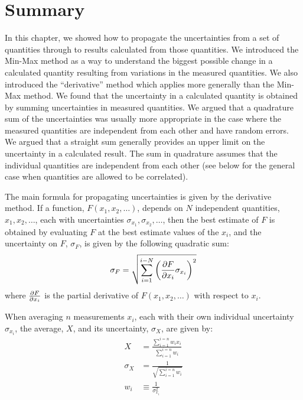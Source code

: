 \section{Summary}
\begin{chapterSummary}
In this chapter, we showed how to propagate the uncertainties from a set of quantities through to results calculated from those quantities. We introduced the Min-Max method as a way to understand the biggest possible change in a calculated quantity resulting from variations in the measured quantities. We also introduced the ``derivative'' method which applies more generally than the Min-Max method. We found that the uncertainty in a calculated quantity is obtained by summing uncertainties in measured quantities. We argued that a quadrature sum of the uncertainties was usually more appropriate in the case where the measured quantities are independent from each other and have random errors. We argued that a straight sum generally provides an upper limit on the uncertainty in a calculated result. The sum in quadrature assumes that the individual quantities are independent from each other (see below for the general case when quantities are allowed to be correlated).

The main formula for propagating uncertainties is given by the derivative method. If a function, $F(x_1, x_2, \dots)$, depends on $N$ independent quantities, $x_1, x_2, \dots$, each with uncertainties $\sigma_{x_1}, \sigma_{x_2}, \dots$, then the best estimate of $F$ is obtained by evaluating $F$ at the best estimate values of the $x_i$, and the uncertainty on $F$, $\sigma_{F}$, is given by the following quadratic sum:
\begin{align}
\sigma_{F} = \sqrt{\sum_{i=1}^{i-N}\left(\frac{\partial F}{\partial x_i}\sigma_{x_i}\right)^2}
\end{align}
where $\frac{\partial F}{\partial x_i}$ is the partial derivative of $F(x_1, x_2, \dots)$ with respect to $x_i$.

When averaging $n$ measurements $x_i$, each with their own individual uncertainty $\sigma_{x_i}$, the average, $X$, and its uncertainty, $\sigma_{X}$, are given by:
\begin{align*}
X &= \frac{\sum_{i=1}^{i=n}w_ix_i}{\sum_{i=1}^{i=n}w_i}\\
\sigma_{X} &= \frac{1}{\sqrt{\sum_{i=1}^{i=n}w_i}}\\
w_i&\equiv\frac{1}{\sigma_{x_i}^2}
\end{align*}


\end{chapterSummary}

